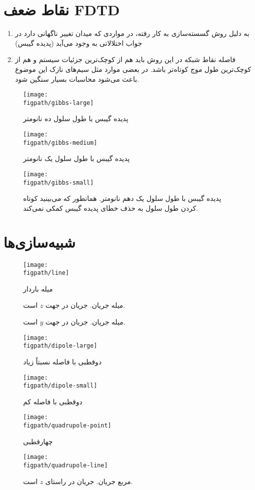 \documentclass[12pt,a4paper]{article}
\newcommand{\figpath}{../figures}
\newcommand{\figwidth}{0.9\linewidth}
\begin{document}
	\section{نقاط ضعف FDTD}
	\begin{enumerate}
		\item به دلیل روش گسسته‌سازی به کار رفته، در مواردی که میدان تغییر ناگهانی دارد در جواب اختلالاتی به وجود می‌آید (پدیده گیبس)
		\item فاصله نقاط شبکه در این روش باید هم از کوچک‌ترین جزئیات سیستم و هم از کوچک‌ترین طول موج کوتاه‌تر باشد.
		در بعضی موارد مثل سیم‌های نازک این موضوع باعث می‌شود محاسبات بسیار سنگین شود.
	\end{enumerate}
	\begin{figure}
		\centering
		\texttt{[image: \\figpath/gibbs-large]}
		\caption{پدیده گیبس با طول سلول ده نانومتر}
		\texttt{[image: \\figpath/gibbs-medium]}
		\caption{پدیده گیبس با طول سلول یک نانومتر}
	\end{figure}
	\begin{figure}
		\centering
		\texttt{[image: \\figpath/gibbs-small]}
		\caption{پدیده گیبس با طول سلول یک دهم نانومتر. همانطور که می‌بینید کوتاه کردن طول سلول به حذف خطای پدیده گیبس کمکی نمی‌کند.}
	\end{figure}
	\FloatBarrier\section{شبیه‌سازی‌ها}
	\begin{figure}[htb!]
		\centering
		\texttt{[image: \\figpath/line]}
		\caption{میله باردار}
	\end{figure}
	\begin{figure}
		\centering
		\caption{میله جریان. جریان در جهت $z$ است.}
		\caption{میله جریان. جریان در جهت $y$ است.}
	\end{figure}
	\restoregeometry
	\begin{figure}
		\centering
		\texttt{[image: \\figpath/dipole-large]}
		\caption{دوقطبی با فاصله نسبتاً زیاد}
		\texttt{[image: \\figpath/dipole-small]}
		\caption{دوقطبی با فاصله کم}
	\end{figure}
	\begin{figure}
		\centering
		\texttt{[image: \\figpath/quadrupole-point]}
		\caption{چهارقطبی}
		\texttt{[image: \\figpath/quadrupole-line]}
		\caption{مربع جریان. جریان در راستای $z$ است.}
	\end{figure}
\end{document}
